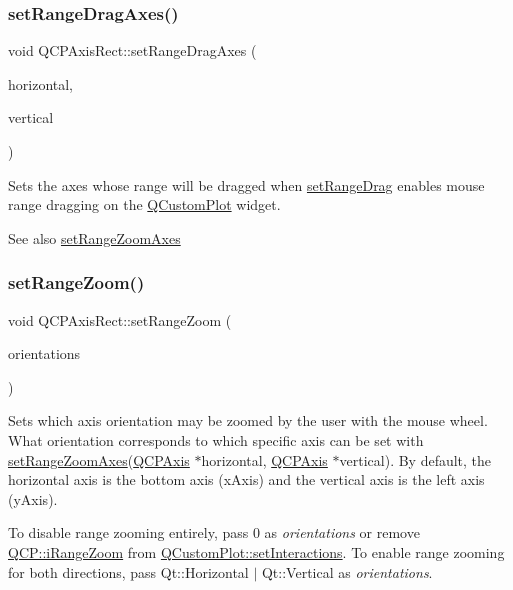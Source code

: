 \subsubsection{\texorpdfstring{set\+Range\+Drag\+Axes()}{setRangeDragAxes()}}
{\footnotesize\ttfamily void Q\+C\+P\+Axis\+Rect\+::set\+Range\+Drag\+Axes (\begin{DoxyParamCaption}\item[{\hyperlink{class_q_c_p_axis}{Q\+C\+P\+Axis} $\ast$}]{horizontal,  }\item[{\hyperlink{class_q_c_p_axis}{Q\+C\+P\+Axis} $\ast$}]{vertical }\end{DoxyParamCaption})}

Sets the axes whose range will be dragged when \hyperlink{class_q_c_p_axis_rect_ae6aef2f7211ba6097c925dcd26008418}{set\+Range\+Drag} enables mouse range dragging on the \hyperlink{class_q_custom_plot}{Q\+Custom\+Plot} widget.

\begin{DoxySeeAlso}{See also}
\hyperlink{class_q_c_p_axis_rect_a9442cca2aa358405f39a64d51eca13d2}{set\+Range\+Zoom\+Axes} 
\end{DoxySeeAlso}
\hypertarget{class_q_c_p_axis_rect_a7960a9d222f1c31d558b064b60f86a31}{}\label{class_q_c_p_axis_rect_a7960a9d222f1c31d558b064b60f86a31} 
\subsubsection{\texorpdfstring{set\+Range\+Zoom()}{setRangeZoom()}}
{\footnotesize\ttfamily void Q\+C\+P\+Axis\+Rect\+::set\+Range\+Zoom (\begin{DoxyParamCaption}\item[{Qt\+::\+Orientations}]{orientations }\end{DoxyParamCaption})}

Sets which axis orientation may be zoomed by the user with the mouse wheel. What orientation corresponds to which specific axis can be set with \hyperlink{class_q_c_p_axis_rect_a9442cca2aa358405f39a64d51eca13d2}{set\+Range\+Zoom\+Axes}(\hyperlink{class_q_c_p_axis}{Q\+C\+P\+Axis} $\ast$horizontal, \hyperlink{class_q_c_p_axis}{Q\+C\+P\+Axis} $\ast$vertical). By default, the horizontal axis is the bottom axis (x\+Axis) and the vertical axis is the left axis (y\+Axis).

To disable range zooming entirely, pass 0 as {\itshape orientations} or remove \hyperlink{namespace_q_c_p_a2ad6bb6281c7c2d593d4277b44c2b037abee1e94353525a636aeaf0ba32b72e14}{Q\+C\+P\+::i\+Range\+Zoom} from \hyperlink{class_q_custom_plot_a5ee1e2f6ae27419deca53e75907c27e5}{Q\+Custom\+Plot\+::set\+Interactions}. To enable range zooming for both directions, pass {\ttfamily Qt\+::\+Horizontal $\vert$ Qt\+::\+Vertical} as {\itshape orientations}.

